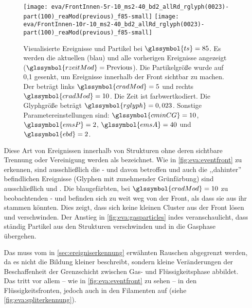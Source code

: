 \begin{figure}
	\texttt{[image: eva/FrontInnen-5r-10\_ms2-40\_bd2\_allRd\_rglyph(0023)-part(100)\_reaMod(previous)\_f85-small]}
	\texttt{[image: eva/FrontInnen-10r-10\_ms2-40\_bd2\_allRd\_rglyph(0023)-part(100)\_reaMod(previous)\_f85-small]}
	\caption{Visualisierte Ereignisse und Partikel bei $\glssymbol{ts} = 85$. Es werden die aktuellen (blau) und alle vorherigen Ereignisse angezeigt ($\glssymbol{rzeitMod} = \text{Previous}$). Die Partikelgröße wurde auf 0,1 gesenkt, um  Ereignisse innerhalb der Front sichtbar zu machen. Der  beträgt links $\glssymbol{cradMod} = 5$ und rechts $\glssymbol{cradMod} = 10$. Die Zeit ist farbwertkodiert. Die Glyphgröße beträgt $\glssymbol{rglyph} = 0,023$. Sonstige Parametereinstellungen sind: $\glssymbol{cminCG} = 10$,  $\glssymbol{emsP} = 2$,  $\glssymbol{emsA} = 40$ und $\glssymbol{ebd} = 2$.}\label{fig:eva:eventfront}
\end{figure}

Diese Art von Ereignissen innerhalb von Strukturen ohne deren sichtbare Trennung oder Vereinigung werden als  bezeichnet. Wie in \autoref{fig:eva:eventfront} zu erkennen, sind ausschließlich die - und  davon betroffen und auch die ,,dahinter'' befindlichen Ereignisse (Glyphen mit zunehmender Grünfärbung) sind ausschließlich  und . Die blaugefärbten, bei $\glssymbol{cradMod} = 10$ zu beobachtenden - und  befinden sich zu weit weg von der Front, als dass sie aus ihr stammen könnten. Dies zeigt, dass sich keine kleinen Cluster aus der Front lösen und verschwinden. Der Anstieg in \autoref{fig:eva:gasparticles} indes veranschaulicht, dass ständig Partikel aus den Strukturen verschwinden und in die Gasphase übergehen.

Das  muss vom in \autoref{sec:ereigniserkennung} erwähnten Rauschen abgegrenzt werden, da es nicht die Bildung kleiner  beschreibt, sondern kleine Veränderungen der Beschaffenheit der Grenzschicht zwischen Gas- und Flüssigkeitsphase abbildet. Das  tritt vor allem -- wie in \autoref{fig:eva:eventfront} zu sehen -- in den Flüssigkeitsfronten, jedoch auch in den Filamenten auf (siehe \autoref{fig:eva:spliterkennung}).

